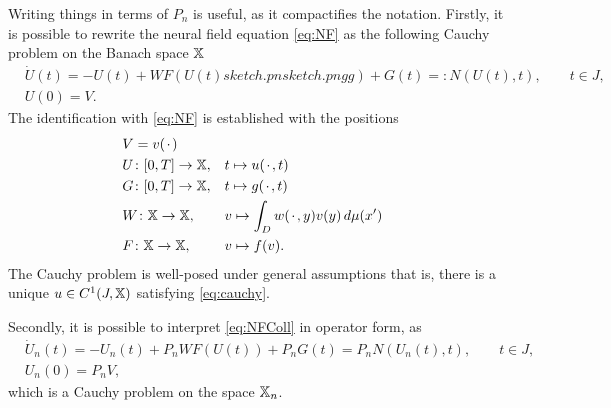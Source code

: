 \documentclass[a4paper]{siamart190516}
\begin{document}
Writing things in terms of $P_n$ is useful, as it compactifies the notation. Firstly,
it is possible to rewrite the neural field equation \cref{eq:NF} as the following
Cauchy problem on the Banach space $\mathbb{X}$
\begin{equation}\label{eq:cauchy}
  \begin{aligned}
  & \dot U(t) = - U(t) + WF(U(t)sketch.pnsketch.pngg) + G(t) =:  N(U(t),t), \qquad t \in J, \\
  & U(0) = V.
  \end{aligned}
\end{equation}
The identification with \cref{eq:NF} is established with the positions
\[
  \begin{aligned}
   & V = v({\mkern 2mu\cdot\mkern 2mu})\\
   & U \colon [0,T] \to \mathbb{X}, && t \mapsto u({\mkern 2mu\cdot\mkern 2mu},t) \\
   & G \colon [0,T] \to \mathbb{X}, && t \mapsto g({\mkern 2mu\cdot\mkern 2mu},t) \\
   & W \colon \mathbb{X} \to \mathbb{X}, && v \mapsto \int_{D} w({\mkern 2mu\cdot\mkern 2mu},y) v(y) \,d \mu(x') \\
   & F \colon \mathbb{X} \to \mathbb{X}, && v \mapsto f(v). 
  \end{aligned}
\]
The Cauchy problem is well-posed under general assumptions that is, there is a unique
$u \in C^1(J,\mathbb{X})$ satisfying \cref{eq:cauchy}.

Secondly, it is possible to interpret \cref{eq:NFColl} in operator form, as
\begin{equation}\label{eq:cauchyPn}
  \begin{aligned}
  & \dot U_n(t) = - U_n(t) + P_n WF(U(t)) + P_n G(t) =  P_n N(U_n(t),t), \qquad t \in J, \\
  & U_n(0) = P_n V,
  \end{aligned}
\end{equation}
which is a Cauchy problem on the space $\mathbb{X}_{n}$.
\end{document}
